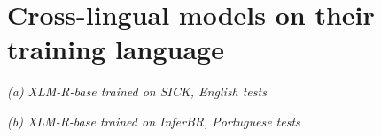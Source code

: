 \appendix
\section{Cross-lingual models on their training language}
\label{sec:appendix-xl}

\begin{table}[h]
  \centering\footnotesize\setlength{\tabcolsep}{4pt}
  \textit{(a) XLM-R-base trained on SICK, English tests}\\[2pt]
  
  \vspace{6pt}

  \textit{(b) XLM-R-base trained on InferBR, Portuguese tests}\\[2pt]
  
  \caption{Cross-lingual models of \cref{tab:main}~(c,\,d) evaluated on the test sets of their training
  language (same format as \cref{tab:main}: accuracy and MCC of the binary decision, $\times100$, mean
  over 10 seeds). $^{\dagger}$Paired Wilcoxon $p<0.05$ against \cls{} on the same metric.}
  \label{tab:xl-same-language}
\end{table}
